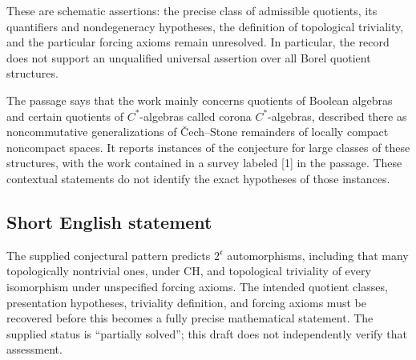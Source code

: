 \documentclass[11pt]{article}
\begin{document}
These are schematic assertions: the precise class of admissible quotients, its quantifiers and nondegeneracy hypotheses, the definition of topological triviality, and the particular forcing axioms remain unresolved. In particular, the record does not support an unqualified universal assertion over all Borel quotient structures.

The passage says that the work mainly concerns quotients of Boolean algebras and certain quotients of \(C^*\)-algebras called corona \(C^*\)-algebras, described there as noncommutative generalizations of \v{C}ech--Stone remainders of locally compact noncompact spaces. It reports instances of the conjecture for large classes of these structures, with the work contained in a survey labeled [1] in the passage. These contextual statements do not identify the exact hypotheses of those instances.
\subsection{Short English statement}
The supplied conjectural pattern predicts \(2^{\mathfrak c}\) automorphisms, including that many topologically nontrivial ones, under CH, and topological triviality of every isomorphism under unspecified forcing axioms. The intended quotient classes, presentation hypotheses, triviality definition, and forcing axioms must be recovered before this becomes a fully precise mathematical statement. The supplied status is ``partially solved''; this draft does not independently verify that assessment.
\end{document}
